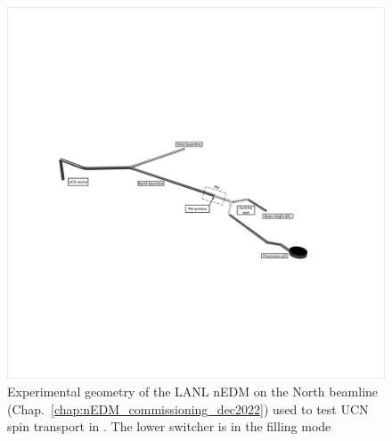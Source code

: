 \begin{figure}
    \includegraphics[width=\textwidth]{figures/2022_north_beamline_cell_pentrack.pdf}
    \caption{Experimental geometry of the LANL nEDM on the North beamline (Chap.~\ref{chap:nEDM_commissioning_dec2022}) used to test UCN spin transport in \pentrack. The lower switcher is in the filling mode}\label{fig:2022_beamline_pentrack_cell}
\end{figure}

